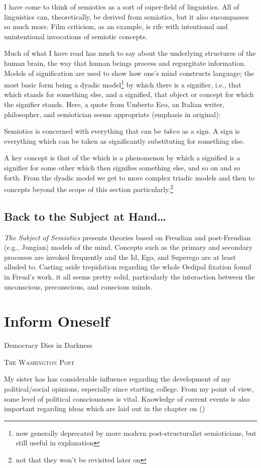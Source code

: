 \documentclass[../butidigress.tex]{subfiles}
\begin{document}
I have come to think of semiotics as a sort of super-field of linguistics.
All of linguistics can, theoretically, be derived from semiotics, but it also encompasses so much more.
Film criticism, as an example, is rife with intentional and unintentional invocations of semiotic concepts.

Much of what I have read has much to say about the underlying structures of the human brain, the way that human beings process and regurgitate information.
Models of signification are used to show how one's mind constructs language; the most basic form being a dyadic model\footnote{now generally deprecated by more modern post-structuralist semioticians, but still useful in explanation} by which there is a signifier, i.e., that which stands for something else, and a signified, that object or concept for which the signifier stands.
Here, a quote from Umberto Eco, an Italian writer, philosopher, and semiotician seems appropriate (emphasis in original):
\begin{displayquote}
Semiotics is concerned with everything that can be \emph{taken} as a sign.
A sign is everything which can be taken as significantly substituting for something else.\autocite{ecosemiotics}
\end{displayquote}

A key concept is that of the  which is a phenomenon by which a signified is a signifier for some other  which then signifies something else, and so on and so forth.
From the dyadic model we get to more complex triadic models and then to concepts beyond the scope of this section particularly.\footnote{not that they won't be revisited later on}

\subsection{Back to the Subject at Hand\ldots}

\textit{The Subject of Semiotics} presents theories based on Freudian and post-Freudian (e.g., Jungian) models of the mind.
Concepts such as the primary and secondary processes are invoked frequently and the Id, Ego, and Superego are at least alluded to.
Casting aside trepidation regarding the whole Oedipal fixation found in Freud's work, it all seems pretty solid, particularly the interaction between the unconscious, preconscious, and conscious minds.

\section{Inform Oneself}
\epigraph{Democracy Dies in Darkness}{\textsc{The Washington Post}}
My sister has has considerable influence regarding the development of my political/social opinions, especially since starting college.
From my point of view, some level of political consciousness is vital.
Knowledge of current events is also important regarding ideas which are laid out in the chapter on  (\pageref{chap:immutable})
\end{document}
